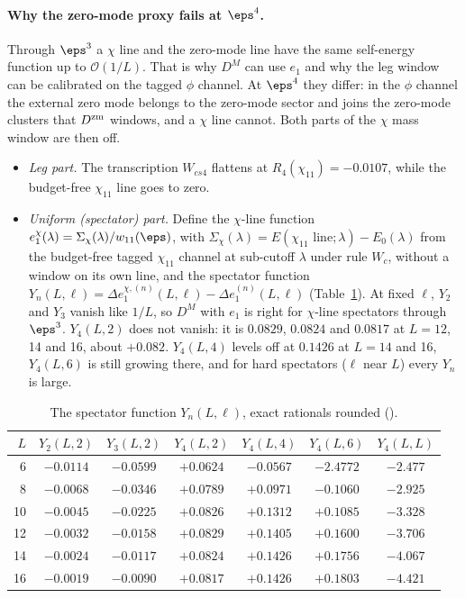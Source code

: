 \paragraph{Why the zero-mode proxy fails at $\eps^4$.} Through $\eps^3$ a $\chi$ line and the zero-mode line have the same
self-energy function up to $\mathcal O(1/L)$. That is why $D^M$ can use $e_1$ and why the leg window can be calibrated on the
tagged $\phi$ channel. At $\eps^4$ they differ: in the $\phi$ channel the external zero mode belongs to the zero-mode sector and
joins the zero-mode clusters that $D^{\rm zm}$ windows, and a $\chi$ line cannot. Both parts of the $\chi$ mass window are then
off.
\begin{itemize}
\item \emph{Leg part.} The transcription $W_{cs4}$ flattens at $R_4(\chi_{11})=-0.0107$, while the budget-free $\chi_{11}$
 line goes to zero.
\item \emph{Uniform (spectator) part.} Define the $\chi$-line function $e_1^\chi(\lambda)=\Sigma_\chi(\lambda)/w_{11}(\eps)$, with
 $\Sigma_\chi(\lambda)=E(\chi_{11}\text{ line};\lambda)-E_0(\lambda)$ from the budget-free tagged $\chi_{11}$ channel at sub-cutoff
 $\lambda$ under rule $W_c$, without a window on its own line, and the spectator function
 $Y_n(L,\ell)=\Delta e_1^{\chi,(n)}(L,\ell)-\Delta e_1^{(n)}(L,\ell)$ (Table~\ref{d2:tab:Y4}). At fixed $\ell$, $Y_2$ and $Y_3$
 vanish like $1/L$, so $D^M$ with $e_1$ is right for $\chi$-line spectators through $\eps^3$. $Y_4(L,2)$ does not vanish: it is
 $0.0829$, $0.0824$ and $0.0817$ at $L=12$, 14 and 16, about $+0.082$. $Y_4(L,4)$ levels off at $0.1426$ at $L=14$ and 16, $Y_4(L,6)$ is still
 growing there, and for hard spectators ($\ell$ near $L$) every $Y_n$ is large.
\end{itemize}

\begin{table}[ht]
\centering\footnotesize\renewcommand{\arraystretch}{1.15}
\begin{tabular}{@{}rcccccc@{}}
\toprule
$L$ & $Y_2(L,2)$ & $Y_3(L,2)$ & $Y_4(L,2)$ & $Y_4(L,4)$ & $Y_4(L,6)$ & $Y_4(L,L)$ \\\midrule
6 & $-0.0114$ & $-0.0599$ & $+0.0624$ & $-0.0567$ & $-2.4772$ & $-2.477$ \\
8 & $-0.0068$ & $-0.0346$ & $+0.0789$ & $+0.0971$ & $-0.1060$ & $-2.925$ \\
10 & $-0.0045$ & $-0.0225$ & $+0.0826$ & $+0.1312$ & $+0.1085$ & $-3.328$ \\
12 & $-0.0032$ & $-0.0158$ & $+0.0829$ & $+0.1405$ & $+0.1600$ & $-3.706$ \\
14 & $-0.0024$ & $-0.0117$ & $+0.0824$ & $+0.1426$ & $+0.1756$ & $-4.067$ \\
16 & $-0.0019$ & $-0.0090$ & $+0.0817$ & $+0.1426$ & $+0.1803$ & $-4.421$ \\
\bottomrule
\end{tabular}
\caption{The spectator function $Y_n(L,\ell)$, exact rationals rounded ().}
\label{d2:tab:Y4}
\end{table}

